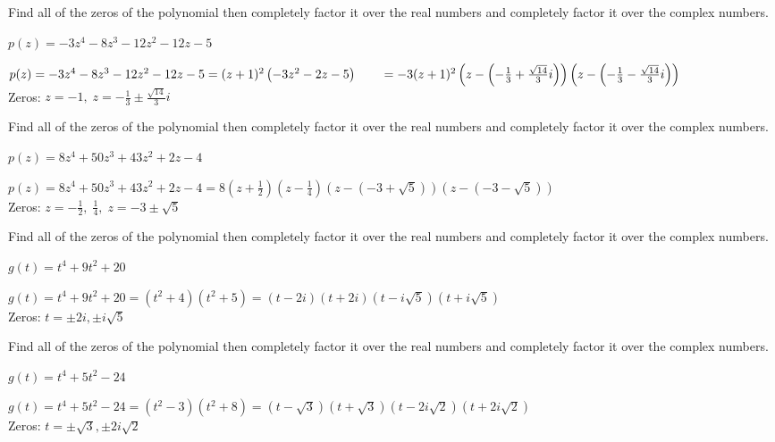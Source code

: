 \documentclass{ximera}
\begin{document}
\begin{problem}
Find all of the zeros of the polynomial then completely factor it over the real numbers and completely factor it over the complex numbers.

$p(z) = -3z^4-8z^3-12z^2-12z-5$

\begin{solution}
$p(z) = -3z^4-8z^3-12z^2-12z-5 = (z+1)^2 \left(-3z^2-2z-5\right) \\
\phantom{f(z)}= -3(z+1)^2\left(z - \left( -\frac{1}{3}+\frac{\sqrt{14}}{3} i\right) \right) \left(z - \left( -\frac{1}{3}-\frac{\sqrt{14}}{3} i\right) \right)$ \\
Zeros:  $z = -1, \; z = -\frac{1}{3} \pm \frac{\sqrt{14}}{3} i$
\end{solution}

\end{problem}

\begin{problem}
Find all of the zeros of the polynomial then completely factor it over the real numbers and completely factor it over the complex numbers.

$p(z) = 8z^4+50z^3+43z^2+2z-4$

\begin{solution}
 $p(z) = 8z^4+50z^3+43z^2+2z-4 = 8\left(z + \frac{1}{2}\right) \left(z - \frac{1}{4}\right)(z - (-3 + \sqrt{5}))(z - (-3 - \sqrt{5}))$ \\
Zeros:  $z = -\frac{1}{2}, \; \frac{1}{4}, \; z = -3 \pm \sqrt{5}$
\end{solution}

\end{problem}

\begin{problem}
Find all of the zeros of the polynomial then completely factor it over the real numbers and completely factor it over the complex numbers.

$g(t) = t^4+9t^2+20$

\begin{solution}
$g(t) = t^4+9t^2+20 = \left(t^2+4\right) \left(t^2+5\right) = (t-2i)(t+2i)\left(t - i \sqrt{5}\right)\left(t + i \sqrt{5}\right)$\\
Zeros:  $t = \pm 2i, \pm i \sqrt{5}$
\end{solution}

\end{problem}

\begin{problem}
Find all of the zeros of the polynomial then completely factor it over the real numbers and completely factor it over the complex numbers.

$g(t) = t^4 + 5t^2 - 24$

\begin{solution}
$g(t) = t^4+5t^2-24 = \left(t^2-3 \right) \left(t^2+8\right) = (t-\sqrt{3})(t+\sqrt{3})\left(t - 2i \sqrt{2}\right)\left(t + 2i \sqrt{2}\right)$\\
Zeros:  $t = \pm \sqrt{3}, \pm 2i \sqrt{2}$
\end{solution}

\end{problem}
\end{document}
